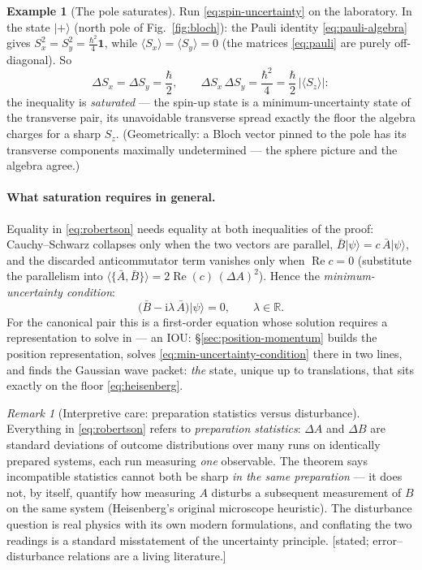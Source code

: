 \documentclass[11pt]{article}
\theoremstyle{plain}
\theoremstyle{definition}
\newtheorem{example}[theorem]{Example}
\theoremstyle{remark}
\newtheorem{remark}[theorem]{Remark}
\newcommand{\ii}{\mathrm{i}}
\newcommand{\R}{\mathbb{R}}
\newcommand{\idop}{\mathbf{1}}  %
\newcommand{\ket}[1]{\lvert #1 \rangle}
\begin{document}
\begin{example}[The pole saturates]\label{ex:spin-saturation}
Run \eqref{eq:spin-uncertainty} on the laboratory. In the state
$\ket+$ (north pole of Fig.~\ref{fig:bloch}): the Pauli identity
\eqref{eq:pauli-algebra} gives $S_x^2 = S_y^2 = \tfrac{\hbar^2}4
\idop$, while $\langle S_x\rangle = \langle S_y\rangle = 0$ (the
matrices \eqref{eq:pauli} are purely off-diagonal). So
\begin{equation}
  \Delta S_x = \Delta S_y = \frac\hbar2,
  \qquad
  \Delta S_x\,\Delta S_y = \frac{\hbar^2}{4}
  = \frac\hbar2\,\bigl|\langle S_z\rangle\bigr| :
\end{equation}
the inequality is \emph{saturated} --- the spin-up state is a
minimum-uncertainty state of the transverse pair, its unavoidable
transverse spread exactly the floor the algebra charges for a sharp
$S_z$. (Geometrically: a Bloch vector pinned to the pole has its
transverse components maximally undetermined --- the sphere picture
and the algebra agree.)
\end{example}

\paragraph{What saturation requires in general.} Equality in
\eqref{eq:robertson} needs equality at both inequalities of the
proof: Cauchy--Schwarz collapses only when the two vectors are
parallel, $\bar B\ket\psi = c\,\bar A\ket\psi$, and the discarded
anticommutator term vanishes only when
$\operatorname{Re} c = 0$ (substitute the parallelism into
$\langle\{\bar A,\bar B\}\rangle = 2\operatorname{Re}(c)\,
(\Delta A)^2$). Hence the \emph{minimum-uncertainty condition}:
\begin{equation}
  \bigl(\bar B - \ii\lambda\,\bar A\bigr)\ket\psi = 0,
  \qquad \lambda \in \R .
  \label{eq:min-uncertainty-condition}
\end{equation}
For the canonical pair this is a first-order equation whose solution
requires a representation to solve in --- an IOU:
\S\ref{sec:position-momentum} builds the position representation,
solves \eqref{eq:min-uncertainty-condition} there in two lines, and
finds the Gaussian wave packet: \emph{the} state, unique up to
translations, that sits exactly on the floor
\eqref{eq:heisenberg}.

\begin{remark}[Interpretive care: preparation statistics versus disturbance]
\label{rem:ensembles-not-disturbance}
Everything in \eqref{eq:robertson} refers to \emph{preparation
statistics}: $\Delta A$ and $\Delta B$ are standard deviations of
outcome distributions over many runs on identically prepared
systems, each run measuring \emph{one} observable. The theorem says
incompatible statistics cannot both be sharp \emph{in the same
preparation} --- it does not, by itself, quantify how measuring $A$
disturbs a subsequent measurement of $B$ on the same system
(Heisenberg's original microscope heuristic). The disturbance
question is real physics with its own modern formulations, and
conflating the two readings is a standard misstatement of the
uncertainty principle. [stated; error--disturbance
relations are a living literature.]
\end{remark}
\end{document}
